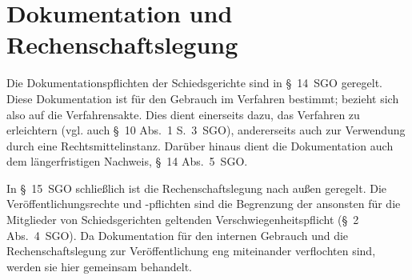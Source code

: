 

\chapter{Dokumentation und Rechenschaftslegung}
\label{Dokumentation}
Die Dokumentationspflichten der Schiedsgerichte sind in \S~14~SGO geregelt.
Diese Dokumentation ist für den Gebrauch im Verfahren bestimmt; bezieht sich also auf die Verfahrensakte.
Dies dient einerseits dazu, das Verfahren zu erleichtern (vgl. auch \S~10 Abs.~1 S.~3~SGO), andererseits auch zur Verwendung durch eine Rechtsmittelinstanz.
Darüber hinaus dient die Dokumentation auch dem längerfristigen Nachweis, \S~14 Abs.~5~SGO.

In \S~15~SGO schließlich ist die Rechenschaftslegung nach außen geregelt.
Die Veröffentlichungsrechte und -pflichten sind die Begrenzung der ansonsten für die Mitglieder von Schiedsgerichten geltenden Verschwiegenheitspflicht (\S~2 Abs.~4~SGO).
Da Dokumentation für den internen Gebrauch und die Rechenschaftslegung zur Veröffentlichung eng miteinander verflochten sind, werden sie hier gemeinsam behandelt.

